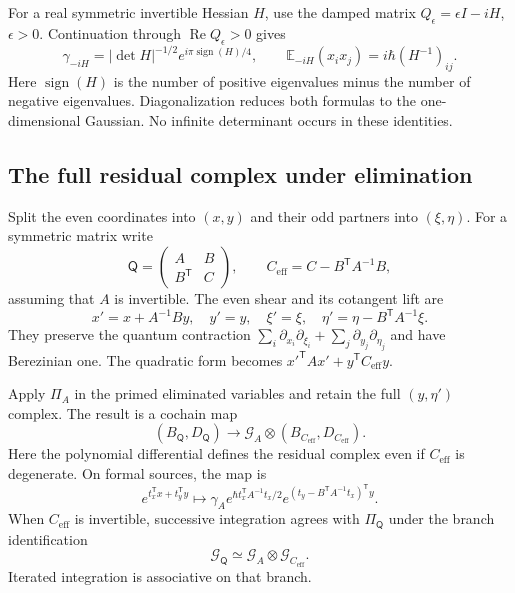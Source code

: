 For a real symmetric invertible Hessian $H$, use the damped
matrix $Q_\epsilon=\epsilon I-iH$, $\epsilon>0$.
Continuation through $\operatorname{Re}Q_\epsilon>0$ gives
\begin{equation}\label{mht:eq:gaussian-state-fresnel}
 \gamma_{-iH}=|\det H|^{-1/2}
                       e^{i\pi\operatorname{sign}(H)/4},
 \qquad \mathbb E_{-iH}(x_ix_j)=i\hbar(H^{-1})_{ij}.
\end{equation}
Here $\operatorname{sign}(H)$ is the number of positive
eigenvalues minus the number of negative eigenvalues.
Diagonalization reduces both formulas to the one-dimensional
Gaussian. No infinite determinant occurs in these identities.

\subsection{The full residual complex under elimination}

Split the even coordinates into $(x,y)$ and their odd partners
into $(\xi,\eta)$. For a symmetric matrix write
\[
 \mathsf Q=\begin{pmatrix}A&B\\B^{\mathsf T}&C\end{pmatrix},
 \qquad C_{\mathrm{eff}}=C-B^{\mathsf T}A^{-1}B,
\]
assuming that $A$ is invertible. The even shear and its
cotangent lift are
\begin{equation}\label{mht:eq:gaussian-state-shear}
 x'=x+A^{-1}By,\quad y'=y,\quad
 \xi'=\xi,\quad \eta'=\eta-B^{\mathsf T}A^{-1}\xi.
\end{equation}
They preserve the quantum contraction
$\sum_i\partial_{x_i}\partial_{\xi_i}
+\sum_j\partial_{y_j}\partial_{\eta_j}$ and have Berezinian one.
The quadratic form becomes
$x'^{\mathsf T}Ax'+y^{\mathsf T}C_{\mathrm{eff}}y$.

\begin{proposition}\label{mht:prop:gaussian-state-sewing}
Apply $\Pi_A$ in the primed eliminated variables and retain
the full $(y,\eta')$ complex. The result is a cochain map
\[
 (B_{\mathsf Q},D_{\mathsf Q})\longrightarrow
 \mathscr G_A\otimes(B_{C_{\mathrm{eff}}},D_{C_{\mathrm{eff}}}).
\]
Here the polynomial differential defines the residual complex
even if $C_{\mathrm{eff}}$ is degenerate. On formal sources,
the map is
\begin{equation}\label{mht:eq:partial-gaussian-state-source}
 e^{t_x^{\mathsf T}x+t_y^{\mathsf T}y}\longmapsto
 \gamma_Ae^{\hbar t_x^{\mathsf T}A^{-1}t_x/2}
             e^{(t_y-B^{\mathsf T}A^{-1}t_x)^{\mathsf T}y}.
\end{equation}
When $C_{\mathrm{eff}}$ is invertible, successive integration
agrees with $\Pi_{\mathsf Q}$ under the branch identification
\[
 \mathscr G_{\mathsf Q}\simeq
                  \mathscr G_A\otimes\mathscr G_{C_{\mathrm{eff}}}.
\]
Iterated integration is associative on that branch.
\end{proposition}

